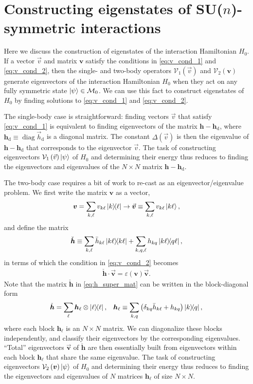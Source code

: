 \documentclass[nofootinbib,notitlepage,11pt]{revtex4-2}
\newcommand{\p}[1]{\left(#1\right)} %
\renewcommand{\c}{\cdot} %
\newcommand{\m}{\bm} %
\renewcommand{\v}{\vec} %
\newcommand{\1}{\mathds{1}}
\renewcommand{\d}{\text{d}}
\newcommand{\e}{\varepsilon}
\newcommand{\M}{\mathcal{M}}
\newcommand{\V}{\mathcal{V}}
\DeclareMathOperator{\diag}{diag}
\begin{document}
\section{Constructing eigenstates of SU($n$)-symmetric interactions}

Here we discuss the construction of eigenstates of the interaction
Hamiltonian $H_0$.  If a vector $\v v$ and matrix $\m v$ satisfy the
conditions in \eqref{eq:v_cond_1} and \eqref{eq:v_cond_2}, then the
single- and two-body operators $\V_1\p{\v v}$ and $\V_2\p{\m v}$
generate eigenvectors of the interaction Hamiltonian $H_0$ when they
act on any fully symmetric state $\ket\psi\in\M_0$.  We can use this
fact to construct eigenstates of $H_0$ by finding solutions to
\eqref{eq:v_cond_1} and \eqref{eq:v_cond_2}.

The single-body case is straightforward: finding vectors $\v v$ that
satisfy \eqref{eq:v_cond_1} is equivalent to finding eigenvectors of
the matrix $\m h-\m h_\d$, where $\m h_\d\equiv\diag\v h_\d$ is a
diagonal matrix.  The constant $\Delta\p{\v v}$ is then the eigenvalue
of $\m h-\m h_\d$ that corresponds to the eigenvector $\v v$.  The
task of constructing eigenvectors $\V_1\p{\v v}\ket\psi$ of $H_0$ and
determining their energy thus reduces to finding the eigenvectors and
eigenvalues of the $N\times N$ matrix $\m h-\m h_\d$.

The two-body case requires a bit of work to re-cast as an
eigenvector/eigenvalue problem.  We first write the matrix $\m v$ as a
vector,
\begin{align}
  \m v = \sum_{k,\ell} v_{k\ell} \op{k}{\ell}
  \to \v{\m v} \equiv \sum_{k,\ell} v_{k\ell} \ket{k\ell},
\end{align}
and define the matrix
\begin{align}
  \check{\m h}
  \equiv \sum_{k,\ell} \bar h_{k\ell} \op{k\ell}
  + \sum_{k,q,\ell} h_{kq} \op{k\ell}{q\ell},
  \label{eq:h_super_mat}
\end{align}
in terms of which the condition in \eqref{eq:v_cond_2} becomes
\begin{align}
  \check{\m h} \c \v{\m v} = \e\p{\m v} \v{\m v}.
\end{align}
Note that the matrix $\check{\m h}$ in \eqref{eq:h_super_mat} can be
written in the block-diagonal form
\begin{align}
  \check{\m h} = \sum_\ell \m h_\ell \otimes \op{\ell},
  &&
  \m h_\ell
  \equiv \sum_{k,q}\p{\delta_{kq} \bar h_{k\ell} + h_{kq}} \op{k}{q},
\end{align}
where each block $\m h_\ell$ is an $N\times N$ matrix.  We can
diagonalize these blocks independently, and classify their
eigenvectors by the corresponding eigenvalues.  ``Total'' eigenvectors
$\v{\m v}$ of $\check{\m h}$ are then essentially built from
eigenvectors within each block $\m h_\ell$ that share the same
eigenvalue.  The task of constructing eigenvectors
$\V_2\p{\m v}\ket\psi$ of $H_0$ and determining their energy thus
reduces to finding the eigenvectors and eigenvalues of $N$ matrices
$\m h_\ell$ of size $N\times N$.
\end{document}
